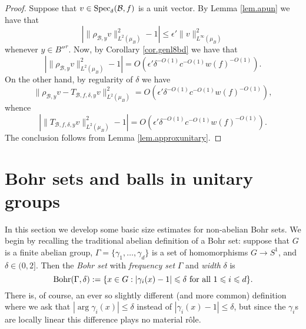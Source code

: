 \documentclass[12pt]{amsart}
\numberwithin{equation}{section}
\theoremstyle{plain}
\theoremstyle{definition}
\renewcommand{\leq}{\leqslant}
\providecommand{\Spec}{\mathop{\rm Spec}\nolimits}
\providecommand{\Bohr}{\mathop{\rm Bohr}\nolimits}
\begin{document}
\begin{proof}
Suppose that $v \in \Spec_\delta(\mathcal{B},f)$ is a unit vector.  By Lemma \ref{lem.apun} we have that
\begin{equation*}
|\|\rho_{\mathcal{B},y}v\|_{L^2(\mu_B)}^2 - 1| \leq \epsilon' \|v\|_{L^\infty(\mu_B)}^2
\end{equation*}
whenever $y \in B''^r$.  Now, by Corollary \ref{cor.genl8bd} we have that
\begin{equation*}
|\|\rho_{\mathcal{B},y}v\|_{L^2(\mu_B)}^2 - 1| =O(\epsilon' \delta^{-O(1)}c^{-O(1)}w(f)^{-O(1)}).
\end{equation*}
On the other hand, by regularity of $\delta$ we have
\begin{equation*}
\|\rho_{\mathcal{B},y}v - T_{\mathcal{B},f,\delta,y}v\|_{L^2(\mu_B)}^2 = O(\epsilon' \delta^{-O(1)}c^{-O(1)}w(f)^{-O(1)}),
\end{equation*}
whence
\begin{equation*}
|\|T_{\mathcal{B},f,\delta,y}v\|_{L^2(\mu_B)}^2 -1 | = O(\epsilon' \delta^{-O(1)}c^{-O(1)}w(f)^{-O(1)}).
\end{equation*}
The conclusion follows from Lemma \ref{lem.approxunitary}.
\end{proof}

\section{Bohr sets and balls in unitary groups}\label{sec.bohrandunball}

In this section we develop some basic size estimates for non-abelian Bohr sets.  We begin by recalling the traditional abelian definition of a Bohr set:  suppose that $G$ is a finite abelian group, $\Gamma=\{\gamma_1,\dots,\gamma_d\}$ is a set of homomorphisms $G \rightarrow S^1$, and $\delta \in (0,2]$. Then the \emph{Bohr set} with \emph{frequency set} $\Gamma$ and \emph{width} $\delta$ is
\begin{equation*}
\Bohr(\Gamma,\delta):=\{x \in G: |\gamma_i(x) - 1| \leq \delta \textrm{ for all } 1 \leq i \leq d\}.
\end{equation*}
There is, of course, an ever so slightly different (and more common) definition where we ask that $|\arg \gamma_i(x)| \leq \delta$ instead of $|\gamma_i(x)-1| \leq \delta$, but since the $\gamma_i$s are locally linear this difference plays no material r\^{o}le.
\end{document}
